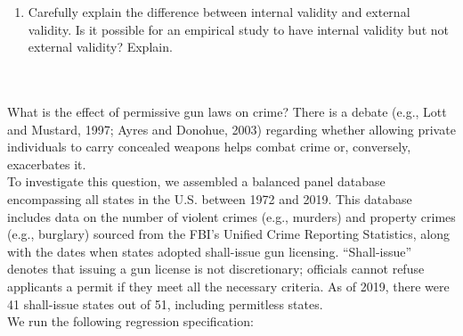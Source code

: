 \documentclass{article}
\begin{document}
\begin{enumerate}
{}\\[1em]


    \item Carefully explain the difference between internal validity and external validity. Is it possible for an empirical study to have internal validity but not external validity? Explain. \\[1em]
\\[1em]


\end{enumerate}

\newpage
{}\\[2em]

What is the effect of permissive gun laws on crime? There is a debate (e.g., Lott and Mustard, 1997; Ayres and Donohue, 2003) regarding whether allowing private individuals to carry concealed weapons helps combat crime or, conversely, exacerbates it.\\

To investigate this question, we assembled a balanced panel database encompassing all states in the U.S. between 1972 and 2019. This database includes data on the number of violent crimes (e.g., murders) and property crimes (e.g., burglary) sourced from the FBI's Unified Crime Reporting Statistics, along with the dates when states adopted shall-issue gun licensing. ``Shall-issue'' denotes that issuing a gun license is not discretionary; officials cannot refuse applicants a permit if they meet all the necessary criteria. As of 2019, there were 41 shall-issue states out of 51, including permitless states. \\

We run the following regression specification:
\end{document}
